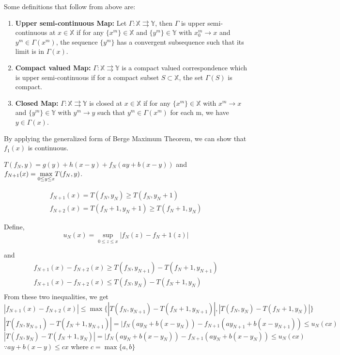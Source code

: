 \begin{tcolorbox}
    Some definitions that follow from above are:
    \begin{enumerate}
        \item {
            \textbf{Upper semi-continuous Map:}
            Let $\Gamma: \mathbb{X} \rightrightarrows \mathbb{Y}$, then $\Gamma$ is upper semi-continuous at $x \in \mathbb{X}$ if for any $\{x^m\} \in \mathbb{X}$ and $\{y^m\} \in \mathbb{Y}$ with $x^m_0 \rightarrow x$ and $y^m \in \Gamma(x^m)$, the sequence $\{y^m\}$ has a convergent subsequence such that its limit is in $\Gamma(x)$.
        }
        \item {
            \textbf{Compact valued Map:}
            $\Gamma: \mathbb{X} \rightrightarrows \mathbb{Y}$ is a compact valued correspondence which is upper semi-continuous if for a compact subset $S \subset \mathbb{X}$, the set $\Gamma(S)$ is compact.
        }
        \item {
            \textbf{Closed Map:}
            $\Gamma: \mathbb{X} \rightrightarrows \mathbb{Y}$ is closed at $x \in \mathbb{X}$ if for any $\{x^m\} \in \mathbb{X}$ with $x^m \rightarrow x$ and $\{y^m\} \in \mathbb{Y}$ with $y^m \rightarrow y$ such that $y^m \in \Gamma(x^m)$ for each m, we have $y \in \Gamma(x)$. 
        }
    \end{enumerate}
\end{tcolorbox}

By applying the generalized form of Berge Maximum Theorem, we can show that $f_1(x)$ is continuous.

\vspace{5mm}
$T(f_N, y) = g(y) + h(x-y) + f_N(ay+b(x-y))$ and $f_{N+1}(x) = \mathlarger{\max}_{0 \le y \le x} T(f_N, y)$.

\begin{align*}
    f_{N+1}(x) = T(f_N, y_N) \ge T(f_N, y_N+1) \\
    f_{N+2}(x) = T(f_N+1, y_N+1) \ge T(f_N+1, y_N)
\end{align*}

Define, 
$$
    u_N(x) = \sup_{0 \le z \le x} |f_N(z) - f_N+1(z)|
$$

and
\begin{align*}
    f_{N+1}(x) - f_{N+2}(x) \ge T(f_N, y_{N+1}) - T(f_N+1, y_{N+1})\\
    f_{N+1}(x) - f_{N+2}(x) \le T(f_N, y_{N}) - T(f_N+1, y_{N})\\
\end{align*}
From these two inequalities, we get
$$
|f_{N+1}(x) - f_{N+2}(x)| \le \max \{|T(f_N, y_{N+1}) - T(f_N+1, y_{N+1})|, |T(f_N, y_{N}) - T(f_N+1, y_{N})|\}
$$
$$
|T(f_N, y_{N+1}) - T(f_N+1, y_{N+1})| = |f_N(ay_N +  b(x-y_N)) - f_{N+1}(ay_{N+1} +  b(x-y_{N+1})) \le u_N(cx)
$$
$$
|T(f_N, y_{N}) - T(f_N+1, y_{N})| = |f_N(ay_N +  b(x-y_N)) - f_{N+1}(ay_{N} +  b(x-y_{N})) \le u_N(cx)
$$
$\because ay+b(x-y) \le cx$ where $c = \max\{a, b\}$

